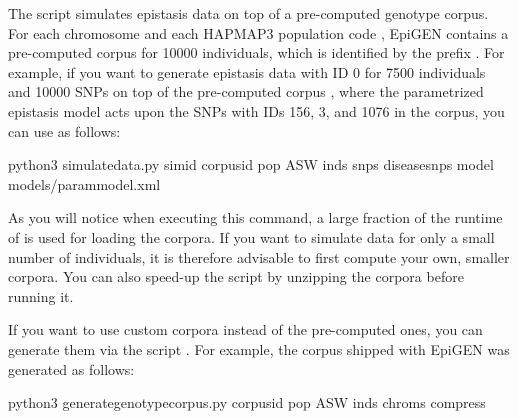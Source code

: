 \documentclass[a4paper,10pt,english]{sphinxhowto}
\begin{document}
The script  simulates epistasis data on top of a pre-computed genotype corpus. For each chromosome  and each HAPMAP3 population code , EpiGEN contains a pre-computed corpus for 10000 individuals, which is identified by the prefix . For example, if you want to generate epistasis data with ID 0 for 7500 individuals and 10000 SNPs on top of the pre-computed corpus , where the parametrized epistasis model  acts upon the SNPs with IDs 156, 3, and 1076 in the corpus, you can use  as follows:

\begin{sphinxVerbatim}[commandchars=\\\{\}]
python3 simulate\PYGZus{}data.py \PYGZhy{}\PYGZhy{}sim\PYGZhy{}id  \PYGZhy{}\PYGZhy{}corpus\PYGZhy{}id  \PYGZhy{}\PYGZhy{}pop ASW \PYGZhy{}\PYGZhy{}inds  \PYGZhy{}\PYGZhy{}snps  \PYGZhy{}\PYGZhy{}disease\PYGZhy{}snps    \PYGZhy{}\PYGZhy{}model models/param\PYGZus{}model.xml  
\end{sphinxVerbatim}

As you will notice when executing this command, a large fraction of the runtime of  is used for loading the corpora. If you want to simulate data for only a small number of individuals, it is therefore advisable to first compute your own, smaller corpora. You can also speed-up the script by unzipping the corpora before running it.

If you want to use custom corpora instead of the pre-computed ones, you can generate them via the script . For example, the corpus  shipped with EpiGEN was generated as follows:

\begin{sphinxVerbatim}[commandchars=\\\{\}]
python3 generate\PYGZus{}genotype\PYGZus{}corpus.py \PYGZhy{}\PYGZhy{}corpus\PYGZhy{}id  \PYGZhy{}\PYGZhy{}pop ASW \PYGZhy{}\PYGZhy{}inds  \PYGZhy{}\PYGZhy{}chroms  \PYGZhy{}\PYGZhy{}compress 
\end{sphinxVerbatim}
\end{document}
